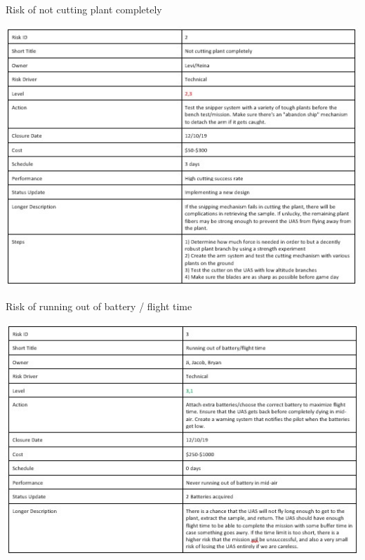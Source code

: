 \documentclass{wrcecapstone}
\begin{document}
\begin{table}
\caption{Risk of not cutting plant completely}
\label{tab:8.3.1b}
\includegraphics[width=\columnwidth]{figures/table-831b.jpg}
\end{table}

\begin{table}
\caption{Risk of running out of battery / flight time}
\label{tab:8.3.1c}
\includegraphics[width=\columnwidth]{figures/table-831c.jpg}
\end{table}
\end{document}
